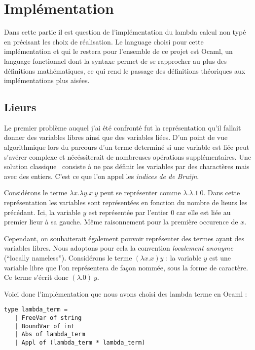 \documentclass{article}
\theoremstyle{definition}
\theoremstyle{remark}
\begin{document}
\section{Implémentation}

Dans cette partie il est question de l'implémentation du lambda calcul
non typé en précisant les choix de réalisation.  Le language choisi
pour cette implémentation et qui le restera pour l'ensemble de ce
projet est Ocaml, un language fonctionnel dont la syntaxe permet de se
rapprocher au plus des définitions mathématiques, ce qui rend le
passage des définitions théoriques aux implémentations plus aisées.


\subsection{Lieurs}

Le premier problème auquel j'ai été confronté fut la représentation
qu'il fallait donner des variables libres ainsi que des variables
liées.  D'un point de vue algorithmique lors du parcours d'un terme
determiné si une variable est liée peut s'avérer complexe et
nécéssiterait de nombreuses opérations supplémentaires.  Une solution
classique~\citep{pierce:tapl} consiste à ne pas définir les variables
par des charactères mais avec des entiers. C'est ce que l'on appel les
\emph{indices de de Bruijn}.

Considérons le terme \(\lambda x. \lambda y. x\: y\) peut se
représenter comme \(\lambda. \lambda. 1\: 0\).  Dans cette
représentation les variables sont représentées en fonction du nombre
de lieurs les précédant.  Ici, la variable \(y\) est représentée par
l'entier 0 car elle est liée au premier lieur à sa gauche. Même
raisonnement pour la première occurence de \(x\).

Cependant, on souhaiterait également pouvoir représenter des termes
ayant des variables libres. Nous adoptons pour cela la convention
\emph{localement
  anonyme}~\citep{mcbride:not-a-variable,chargueraud:locally-nameless}
(``locally nameless''). Considérons le terme \((\lambda x. x) y\) : la
variable \(y\) est une variable libre que l'on représentera de façon
nommée, sous la forme de caractère. Ce terme s'écrit donc
\((\lambda. 0)\: y\).

Voici donc l'implémentation que nous avons choisi des lambda terme en Ocaml :
%
\begin{verbatim}
type lambda_term =   
   | FreeVar of string    
   | BoundVar of int    
   | Abs of lambda_term   
   | Appl of (lambda_term * lambda_term)
\end{verbatim}
\end{document}
